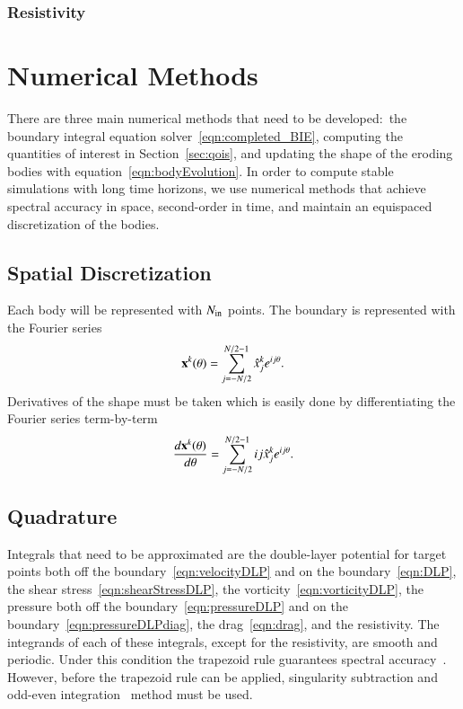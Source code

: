 \documentclass[preprint, 10pt]{elsarticle}
\begin{document}
\subsubsection{Resistivity}



\section{Numerical Methods\label{s:method}} 
There are three main numerical methods that need to be developed:~the
boundary integral equation solver~\eqref{eqn:completed_BIE}, computing
the quantities of interest in Section~\ref{sec:qois}, and updating the
shape of the eroding bodies with equation~\eqref{eqn:bodyEvolution}.  In
order to compute stable simulations with long time horizons, we use
numerical methods that achieve spectral accuracy in space, second-order
in time, and maintain an equispaced discretization of the bodies.


\subsection{Spatial Discretization}
Each body will be represented with $N_{\mathrm{in}}$ points.  The boundary is
represented with the Fourier series
\begin{align*}
  {\mathbf{x}}^k(\theta) = \sum_{j = -N/2}^{N/2-1} \hat{x}_j^k e^{ij\theta}.
\end{align*}
Derivatives of the shape must be taken which is easily done by
differentiating the Fourier series term-by-term
\begin{align*}
  \frac{d{\mathbf{x}}^k(\theta)}{d\theta} = 
      \sum_{j = -N/2}^{N/2-1} ij\hat{x}_j^k e^{ij\theta}.
\end{align*}


\subsection{Quadrature} 
Integrals that need to be approximated are the double-layer potential
for target points both off the boundary~\eqref{eqn:velocityDLP} and on
the boundary~\eqref{eqn:DLP}, the shear
stress~\eqref{eqn:shearStressDLP}, the
vorticity~\eqref{eqn:vorticityDLP}, the pressure both off the
boundary~\eqref{eqn:pressureDLP} and on the
boundary~\eqref{eqn:pressureDLPdiag}, the drag~\eqref{eqn:drag}, and the
resistivity.  The integrands of each of these integrals, except for the
resistivity, are smooth and periodic.  Under this condition the
trapezoid rule guarantees spectral accuracy~\cite{tre-wei2014}.
However, before the trapezoid rule can be applied, singularity
subtraction and odd-even integration~\cite{sid-isr1988} method must be
used.
\end{document}
